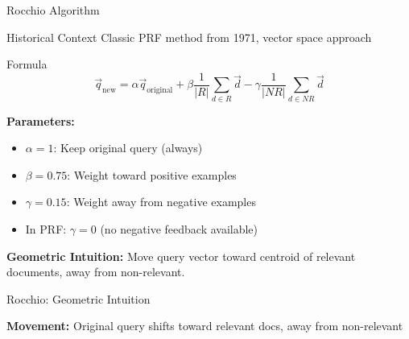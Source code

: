 \documentclass[aspectratio=169]{beamer}
\begin{document}
\begin{frame}[shrink=10]{Rocchio Algorithm}
\begin{block}{Historical Context}
Classic PRF method from 1971, vector space approach
\end{block}

\begin{block}{Formula}
$$\vec{q}_{\text{new}} = \alpha \vec{q}_{\text{original}} + \beta \frac{1}{|R|}\sum_{d \in R} \vec{d} - \gamma \frac{1}{|NR|}\sum_{d \in NR} \vec{d}$$
\end{block}

\textbf{Parameters:}
\begin{itemize}
    \item $\alpha = 1$: Keep original query (always)
    \item $\beta = 0.75$: Weight toward positive examples
    \item $\gamma = 0.15$: Weight away from negative examples
    \item In PRF: $\gamma = 0$ (no negative feedback available)
\end{itemize}

\vspace{0.5em}

\textbf{Geometric Intuition:} Move query vector toward centroid of relevant documents, away from non-relevant.
\end{frame}

\begin{frame}{Rocchio: Geometric Intuition}
\begin{center}

\end{center}

\textbf{Movement:} Original query shifts toward relevant docs, away from non-relevant
\end{frame}
\end{document}
